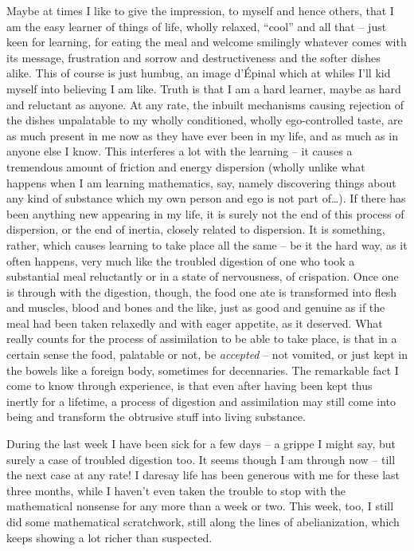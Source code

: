Maybe at times I like to give the impression, to myself and hence
others, that I am the easy learner of things of life, wholly
relaxed, ``cool'' and all that -- just keen for learning,
for eating the meal and welcome smilingly whatever comes with its
message, frustration and sorrow and destructiveness and the softer
dishes alike. This of course is just humbug, an image
d'Épinal which at whiles I'll kid
myself into believing I am like. Truth is that I am a hard learner,
maybe as hard and reluctant as anyone. At any rate, the inbuilt
mechanisms causing rejection of the dishes unpalatable to my wholly
conditioned, wholly ego-controlled taste, are as much present in me
now as they have ever been in my life, and as much as in anyone else I
know. This interferes a lot with the learning -- it causes a
tremendous amount of friction and energy dispersion (wholly unlike
what happens when I am learning mathematics, say, namely discovering
things about any kind of substance which my own person and ego is not
part of\dots). If there has been anything new appearing in my life, it
is surely not the end of this process of dispersion, or the end of
inertia, closely related to dispersion. It is something, rather, which
causes learning to take place all the same -- be it the hard way, as
it often happens, very much like the troubled digestion of one who
took a substantial meal reluctantly or in a state of nervousness, of
crispation. Once one is through with the digestion, though, the food
one ate is transformed into flesh and muscles, blood and bones and the
like, just as good and genuine as if the meal had been taken relaxedly
and with eager appetite, as it deserved. What really counts for the
process of assimilation to be able to take place, is that in a certain
sense the food, palatable or not, be \emph{accepted} -- not vomited,
or just kept in the bowels like a foreign body, sometimes for
decennaries. The remarkable fact I come
to know through experience, is that even after having been kept thus
inertly for a lifetime, a process of digestion and assimilation may
still come into being and transform the obtrusive stuff into living
substance.

During the last week I have been sick for a few days -- a
grippe I might say, but surely a case of
troubled digestion too. It seems though I am through now -- till the
next case at any rate! I daresay life has been generous with me for
these last three months, while I haven't even taken the trouble to
stop with the mathematical nonsense for any more than a week or
two. This week, too, I still did some mathematical scratchwork, still
along the lines of abelianization, which keeps showing a lot richer
than suspected.

